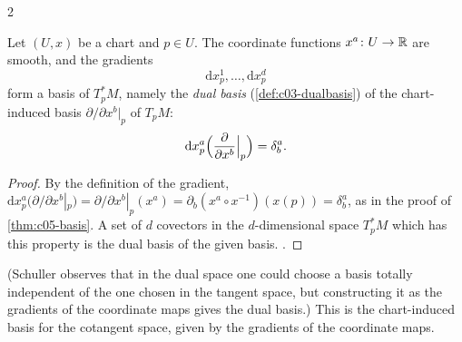 \begin{paracol}{2}
\begin{theorem}\label{thm:c05-dualbasis}
Let $(U,x)$ be a chart and $p\in U$. The coordinate functions $x^a\colon U\to\mathbb{R}$ are smooth, and the gradients
\[
  \mathrm dx^1_p,\dots,\mathrm dx^d_p
\]
form a basis of $T^*_pM$, namely the \emph{dual basis} (\cref{def:c03-dualbasis}) of the chart-induced basis $\partial/\partial x^b|_p$ of $T_pM$:
\[
  \mathrm dx^a_p\Bigl(\frac{\partial}{\partial x^b}\Big|_p\Bigr)=\delta^a_b.
\]
\end{theorem}
\begin{proof}
By the definition of the gradient, $\mathrm dx^a_p\bigl(\partial/\partial x^b|_p\bigr)=\partial/\partial x^b|_p(x^a)=\partial_b(x^a\circ x^{-1})(x(p))=\delta^a_b$, as in the proof of \cref{thm:c05-basis}. A set of $d$ covectors in the $d$-dimensional space $T^*_pM$ which has this property is the dual basis of the given basis.
.
\end{proof}
(Schuller observes that in the dual space one could choose a basis totally independent of the one chosen in the tangent space, but constructing it as the gradients of the coordinate maps gives the dual basis.) This is the chart-induced basis for the cotangent space, given by the gradients of the coordinate maps.


\end{paracol}
